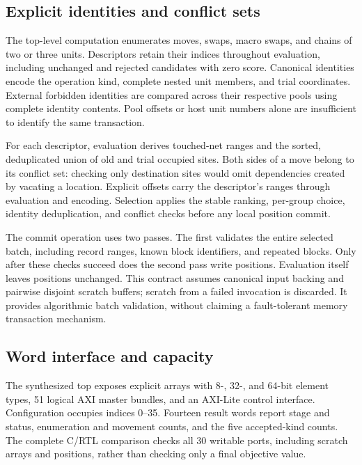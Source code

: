 \subsection{Explicit identities and conflict sets}

The top-level computation enumerates moves, swaps, macro swaps, and chains
of two or three units. Descriptors retain their indices throughout
evaluation, including unchanged and rejected candidates with zero score.
Canonical identities encode the operation kind, complete nested unit members,
and trial coordinates. External forbidden identities are compared across
their respective pools using complete identity contents. Pool offsets or
host unit numbers alone are insufficient to identify the same transaction.

For each descriptor, evaluation derives touched-net ranges and the sorted,
deduplicated union of old and trial occupied sites. Both sides of a move
belong to its conflict set: checking only destination sites would omit
dependencies created by vacating a location. Explicit offsets carry the
descriptor's ranges through evaluation and encoding. Selection applies the
stable ranking, per-group choice, identity deduplication, and conflict checks
before any local position commit.

The commit operation uses two passes. The first validates the entire selected
batch, including record ranges, known block identifiers, and repeated blocks.
Only after these checks succeed does the second pass write positions.
Evaluation itself leaves positions unchanged. This contract assumes canonical
input backing and pairwise disjoint scratch buffers; scratch from a failed
invocation is discarded. It provides algorithmic batch validation, without
claiming a fault-tolerant memory transaction mechanism.

\subsection{Word interface and capacity}

The synthesized top exposes explicit arrays with 8-, 32-, and 64-bit element
types, 51 logical AXI master bundles, and an AXI-Lite control interface.
Configuration occupies indices 0--35. Fourteen result words report stage and
status, enumeration and movement counts, and the five accepted-kind counts.
The complete C/RTL comparison checks all 30 writable ports, including scratch
arrays and positions, rather than checking only a final objective value.

